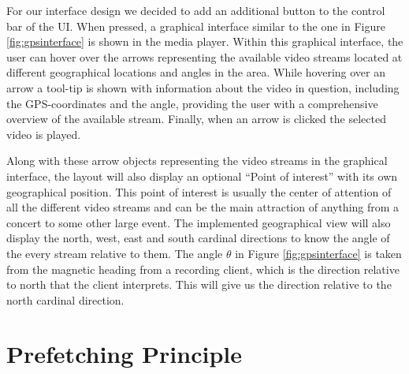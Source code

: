 For our interface design we decided to add an additional button to the control bar of the UI. When pressed, a graphical interface similar to the one in Figure \ref{fig:gpsinterface} is shown in the media player. Within this graphical interface, the user can hover over the arrows representing the available video streams located at different geographical locations and angles in the area. While hovering over an arrow a tool-tip is shown with information about the video in question, including the GPS-coordinates and the angle, providing the user with a comprehensive overview of the available stream. Finally, when an arrow is clicked the selected video is played.

Along with these arrow objects representing the video streams in the graphical interface, the layout will also display an optional “Point of interest” with its own geographical position. This point of interest is usually the center of attention of all the different video streams and can be the main attraction of anything from a concert to some other large event. The implemented geographical view will also display the north, west, east and south cardinal directions to know the angle of the every stream relative to them. The angle $\theta$ in Figure \ref{fig:gpsinterface} is taken from the magnetic heading from a recording client, which is the direction relative to north that the client interprets. This will give us the direction relative to the north cardinal direction.

\section{Prefetching Principle}
\label{sec:prefetching}

